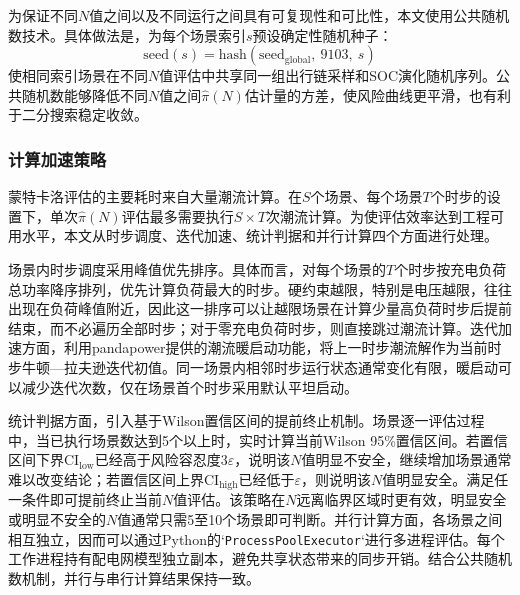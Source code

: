 \documentclass[10pt,a4paper]{article}
\numberwithin{equation}{section}
\numberwithin{table}{section}
\numberwithin{figure}{section}
\begin{document}
    为保证不同$N$值之间以及不同运行之间具有可复现性和可比性，本文使用公共随机数技术。具体做法是，为每个场景索引$s$预设确定性随机种子：
    \begin{equation}
    \label{eq:common_random_seed}
    \text{seed}(s) = \text{hash}(\text{seed}_{\text{global}},\ 9103,\ s)
    \end{equation}
    使相同索引场景在不同$N$值评估中共享同一组出行链采样和SOC演化随机序列。公共随机数能够降低不同$N$值之间$\hat{\pi}(N)$估计量的方差，使风险曲线更平滑，也有利于二分搜索稳定收敛。

    \subsubsection{计算加速策略}

    蒙特卡洛评估的主要耗时来自大量潮流计算。在$S$个场景、每个场景$T$个时步的设置下，单次$\hat{\pi}(N)$评估最多需要执行$S \times T$次潮流计算。为使评估效率达到工程可用水平，本文从时步调度、迭代加速、统计判据和并行计算四个方面进行处理。

    场景内时步调度采用峰值优先排序。具体而言，对每个场景的$T$个时步按充电负荷总功率降序排列，优先计算负荷最大的时步。硬约束越限，特别是电压越限，往往出现在负荷峰值附近，因此这一排序可以让越限场景在计算少量高负荷时步后提前结束，而不必遍历全部时步；对于零充电负荷时步，则直接跳过潮流计算。迭代加速方面，利用pandapower提供的潮流暖启动功能，将上一时步潮流解作为当前时步牛顿—拉夫逊迭代初值。同一场景内相邻时步运行状态通常变化有限，暖启动可以减少迭代次数，仅在场景首个时步采用默认平坦启动。

    统计判据方面，引入基于Wilson置信区间的提前终止机制。场景逐一评估过程中，当已执行场景数达到5个以上时，实时计算当前Wilson 95\%置信区间。若置信区间下界$\text{CI}_{\text{low}}$已经高于风险容忍度$3\varepsilon$，说明该$N$值明显不安全，继续增加场景通常难以改变结论；若置信区间上界$\text{CI}_{\text{high}}$已经低于$\varepsilon$，则说明该$N$值明显安全。满足任一条件即可提前终止当前$N$值评估。该策略在$N$远离临界区域时更有效，明显安全或明显不安全的$N$值通常只需5至10个场景即可判断。并行计算方面，各场景之间相互独立，因而可以通过Python的`\texttt{ProcessPoolExecutor}`进行多进程评估。每个工作进程持有配电网模型独立副本，避免共享状态带来的同步开销。结合公共随机数机制，并行与串行计算结果保持一致。
\end{document}
